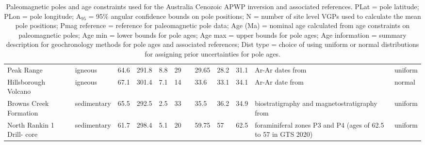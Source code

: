 \documentclass[11pt,letterpaper]{article}
\begin{document}
\begin{table}
\begin{tabular}{p{2.5 cm}lllllp{2.5 cm}lllp{3 cm}l}
Peak Range                       & igneous     & 64.6 & 291.8 & 8.8 & 29  & \cite{Hansma2019a}                & 29.65      & 28.2     & 31.1     & Ar-Ar dates from \cite{Cohen2013a}                                           & uniform           \\
Hillsborough Volcano             & igneous     & 67.1 & 301.4 & 7.1 & 14  & \cite{Hansma2019a}                & 33.6       & 33.1     & 34.1     & Ar-Ar date from \cite{Cohen2013a}                                            & normal          \\
Browns Creek Formation           & sedimentary & 65.5 & 292.5 & 2.5 & 33  & \cite{Idnurm1994a}                & 35.5       & 36.2     & 34.9     & biostratigraphy and magnetostratigraphy from \cite{Shafik1997a}              & uniform           \\
North Rankin 1 Drill- core       & sedimentary & 61.7 & 298.4 & 5.1 & 20  & \cite{Idnurm1985a}                & 59.75      & 57       & 62.5     & foraminiferal zones P3 and P4 (ages of 62.5 to 57 in GTS 2020)               & uniform        
\end{tabular}
\label{tab:Aus_Cenozoic_poles}
\caption{Paleomagnetic poles and age constraints used for the Australia Cenozoic APWP inversion and associated references. PLat = pole latitude; PLon = pole longitude; A$_{95}$ = 95\% angular confidence bounds on pole positions; N = number of site level VGPs used to calculate the mean pole positions; Pmag reference = reference for paleomagnetic pole data; Age (Ma) = nominal age calculated from age constraints on paleomagnetic poles; Age min = lower bounds for pole ages; Age max = upper bounds for pole ages; Age information = summary description for geochronology methods for pole ages and associated references;  Dist type = choice of using uniform or normal distributions for assigning prior uncertainties for pole ages.}
\end{table}
\end{document}
